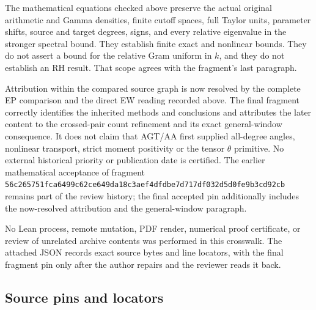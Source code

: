 The mathematical equations checked above preserve the actual original
arithmetic and Gamma densities, finite cutoff spaces, full Taylor units,
parameter shifts, source and target degrees, signs, and every relative
eigenvalue in the stronger spectral bound. They establish finite exact
and nonlinear bounds. They do not assert a bound for the relative Gram
uniform in \(k\), and they do not establish an RH result. That scope
agrees with the fragment's last paragraph.

Attribution within the compared source graph is now resolved by the
complete EP comparison and the direct EW reading recorded above. The
final fragment correctly identifies the inherited methods and
conclusions and attributes the later content to the crossed-pair count
refinement and its exact general-window consequence. It does not claim
that AGT/AA first supplied all-degree angles, nonlinear transport,
strict moment positivity or the tensor \(\theta\) primitive. No external
historical priority or publication date is certified. The earlier
mathematical acceptance of fragment
\nolinkurl{56c265751fca6499c62ce649da18c3aef4dfdbe7d717df032d5d0fe9b3cd92cb}
remains part of the review history; the final accepted pin additionally
includes the now-resolved attribution and the general-window paragraph.

No Lean process, remote mutation, PDF render, numerical proof
certificate, or review of unrelated archive contents was performed in
this crosswalk. The attached JSON records exact source bytes and line
locators, with the final fragment pin only after the author repairs and
the reviewer reads it back.

\subsection{Source pins and locators}\label{source-pins-and-locators}

